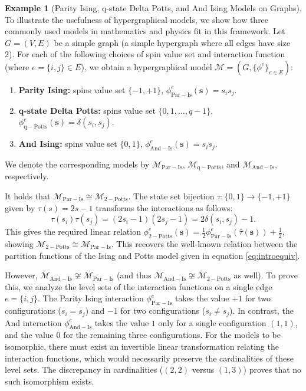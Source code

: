 \documentclass[11pt,reqno]{amsart}
\newcommand{\vecs}{\boldsymbol{s}}
\newcommand{\Mo}{\mathcal{M}}
\theoremstyle{plain}
\theoremstyle{definition}
\newtheorem{example}[theorem]{Example}
\numberwithin{equation}{section}
\begin{document}
\begin{example}[Parity Ising, q-state Delta Potts, and And Ising Models on Graphs]
\label{ex:graphmodequiv}
To illustrate the usefulness of hypergraphical models, we show how three commonly used models in mathematics and physics fit in this framework. Let $G = (V,E)$ be a simple graph (a simple hypergraph where all edges have size 2). For each of the following choices of spin value set and interaction function (where $e = \{i,j\} \in E$), we obtain a hypergraphical model $\Mo = (G, \{\phi^e\}_{e \in E})$:
\begin{enumerate}
    \item \textbf{Parity Ising:} spins value set $\{-1, +1\}$, \quad $\phi^e_{\mathrm{Par-Is}}(\vecs) = s_i s_j$.
    \item \textbf{q-state Delta Potts:} spins value set $\{0, 1, \dots, q-1\}$, \quad $\phi^e_{\mathrm{q-Potts}}(\vecs) = \delta(s_i, s_j)$.
    \item \textbf{And Ising:} spins value set $\{0, 1\}$, \quad $\phi^e_{\mathrm{And-Is}}(\vecs) = s_i s_j$.
\end{enumerate}
We denote the corresponding models by $\Mo_{\mathrm{Par-Is}}$, $\Mo_{\mathrm{q-Potts}}$, and $\Mo_{\mathrm{And-Is}}$, respectively.

It holds that $\Mo_{\mathrm{Par-Is}} \cong \Mo_{\mathrm{2-Potts}}$. The state set bijection $\tau \colon \{0,1\} \to \{-1,+1\}$ given by $\tau(s) = 2s - 1$ transforms the interactions as follows:
\[ \tau(s_i)\tau(s_j) = (2s_i - 1)(2s_j - 1) = 2\delta(s_i, s_j) - 1. \]
This gives the required linear relation $\phi^e_{\mathrm{2-Potts}}(\vecs) = \frac{1}{2} \phi^e_{\mathrm{Par-Is}}(\hat{\tau}(\vecs)) + \frac{1}{2}$, showing $\Mo_{\mathrm{2-Potts}} \cong \Mo_{\mathrm{Par-Is}}$. This recovers the well-known relation between the partition functions of the Ising and Potts model given in equation \eqref{eq:introequiv}.

However, $\Mo_{\mathrm{And-Is}} \not \cong \Mo_{\mathrm{Par-Is}}$ (and thus $\Mo_{\mathrm{And-Is}} \not \cong \Mo_{\mathrm{2-Potts}}$ as well). To prove this, we analyze the level sets of the interaction functions on a single edge $e=\{i,j\}$. The Parity Ising interaction $\phi^e_{\mathrm{Par-Is}}$ takes the value $+1$ for two configurations ($s_i=s_j$) and $-1$ for two configurations ($s_i \neq s_j$). In contrast, the And interaction $\phi^e_{\mathrm{And-Is}}$ takes the value $1$ only for a single configuration $(1,1)$, and the value $0$ for the remaining three configurations. For the models to be isomorphic, there must exist an invertible linear transformation relating the interaction functions, which would necessarily preserve the cardinalities of these level sets. The discrepancy in cardinalities ($(2,2)$ versus $(1,3)$) proves that no such isomorphism exists.
\end{example}
\end{document}
